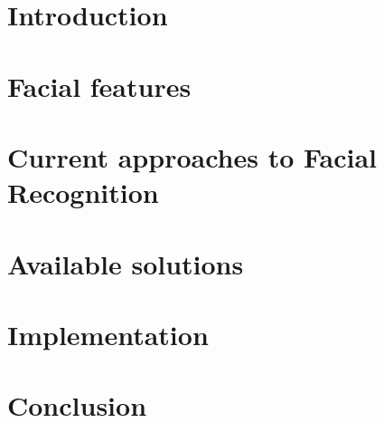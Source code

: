 
\chapter{Introduction}
\label{chapter:introduction}


\chapter{Facial features}
\label{chapter:features}


\chapter{Current approaches to Facial Recognition}
\label{chapter:research}


\chapter{Available solutions}
\label{chapter:solutions}


\chapter{Implementation}
\label{chapter:implementation}


\chapter{Conclusion}
\label{chapter:conclusion}


